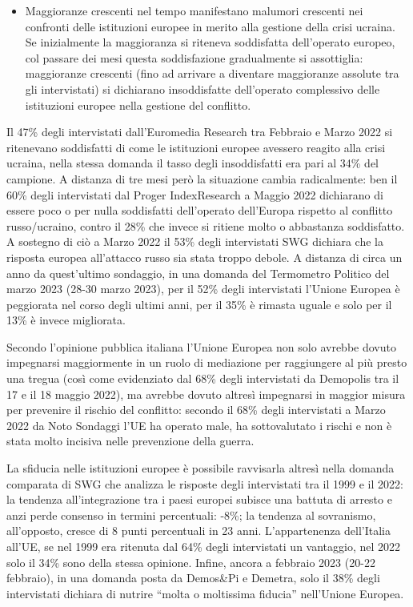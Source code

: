 \documentclass[
  openany]{book}
\providecommand{\tightlist}{%
  \setlength{\itemsep}{0pt}\setlength{\parskip}{0pt}}
\begin{document}
\begin{itemize}
\tightlist
\item
  Maggioranze crescenti nel tempo manifestano malumori crescenti nei confronti delle istituzioni europee in merito alla gestione della crisi ucraina. Se inizialmente la maggioranza si riteneva soddisfatta dell'operato europeo, col passare dei mesi questa soddisfazione gradualmente si assottiglia: maggioranze crescenti (fino ad arrivare a diventare maggioranze assolute tra gli intervistati) si dichiarano insoddisfatte dell'operato complessivo delle istituzioni europee nella gestione del conflitto.
\end{itemize}

Il 47\% degli intervistati dall'Euromedia Research tra Febbraio e Marzo 2022 si ritenevano soddisfatti di come le istituzioni europee avessero reagito alla crisi ucraina, nella stessa domanda il tasso degli insoddisfatti era pari al 34\% del campione. A distanza di tre mesi però la situazione cambia radicalmente: ben il 60\% degli intervistati dal Proger IndexResearch a Maggio 2022 dichiarano di essere poco o per nulla soddisfatti dell'operato dell'Europa rispetto al conflitto russo/ucraino, contro il 28\% che invece si ritiene molto o abbastanza soddisfatto. A sostegno di ciò a Marzo 2022 il 53\% degli intervistati SWG dichiara che la risposta europea all'attacco russo sia stata troppo debole.
A distanza di circa un anno da quest'ultimo sondaggio, in una domanda del Termometro Politico del marzo 2023 (28-30 marzo 2023), per il 52\% degli intervistati l'Unione Europea è peggiorata nel corso degli ultimi anni, per il 35\% è rimasta uguale e solo per il 13\% è invece migliorata.

Secondo l'opinione pubblica italiana l'Unione Europea non solo avrebbe dovuto impegnarsi maggiormente in un ruolo di mediazione per raggiungere al più presto una tregua (così come evidenziato dal 68\% degli intervistati da Demopolis tra il 17 e il 18 maggio 2022), ma avrebbe dovuto altresì impegnarsi in maggior misura per prevenire il rischio del conflitto: secondo il 68\% degli intervistati a Marzo 2022 da Noto Sondaggi l'UE ha operato male, ha sottovalutato i rischi e non è stata molto incisiva nelle prevenzione della guerra.

La sfiducia nelle istituzioni europee è possibile ravvisarla altresì nella domanda comparata di SWG che analizza le risposte degli intervistati tra il 1999 e il 2022: la tendenza all'integrazione tra i paesi europei subisce una battuta di arresto e anzi perde consenso in termini percentuali: -8\%; la tendenza al sovranismo, all'opposto, cresce di 8 punti percentuali in 23 anni. L'appartenenza dell'Italia all'UE, se nel 1999 era ritenuta dal 64\% degli intervistati un vantaggio, nel 2022 solo il 34\% sono della stessa opinione. Infine, ancora a febbraio 2023 (20-22 febbraio), in una domanda posta da Demos\&Pi e Demetra, solo il 38\% degli intervistati dichiara di nutrire ``molta o moltissima fiducia'' nell'Unione Europea.
\end{document}

